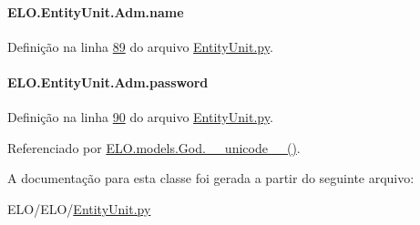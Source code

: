 \paragraph[{name}]{\setlength{\rightskip}{0pt plus 5cm}E\+L\+O.\+Entity\+Unit.\+Adm.\+name}\label{classELO_1_1EntityUnit_1_1Adm_a12f7aaf17dc6e036186e7757244cd12a}


Definição na linha \hyperlink{EntityUnit_8py_source_l00089}{89} do arquivo \hyperlink{EntityUnit_8py_source}{Entity\+Unit.\+py}.

\hypertarget{classELO_1_1EntityUnit_1_1Adm_aed97c3f4efa1320ef99b3794b51f8e5e}{}
\paragraph[{password}]{\setlength{\rightskip}{0pt plus 5cm}E\+L\+O.\+Entity\+Unit.\+Adm.\+password}\label{classELO_1_1EntityUnit_1_1Adm_aed97c3f4efa1320ef99b3794b51f8e5e}


Definição na linha \hyperlink{EntityUnit_8py_source_l00090}{90} do arquivo \hyperlink{EntityUnit_8py_source}{Entity\+Unit.\+py}.



Referenciado por \hyperlink{classELO_1_1models_1_1God_ad885cef3d586b18dd3639ebf3bfd66eb}{E\+L\+O.\+models.\+God.\+\_\+\+\_\+unicode\+\_\+\+\_\+()}.



A documentação para esta classe foi gerada a partir do seguinte arquivo\+:\begin{DoxyCompactItemize}
\item 
E\+L\+O/\+E\+L\+O/\hyperlink{EntityUnit_8py}{Entity\+Unit.\+py}\end{DoxyCompactItemize}
